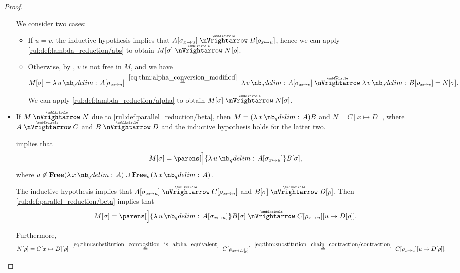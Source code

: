 \begin{proof}
\begin{itemize}
    We consider two cases:
    \begin{itemize}
      \item If \( u = v \), the inductive hypothesis implies that \( A[\sigma_{x \mapsto u}] \ppred B[\rho_{x \mapsto u}] \), hence we can apply \ref{rul:def:lambda_reduction/abs} to obtain \( M[\sigma] \ppred N[\rho] \).

      \item Otherwise, by , \( v \) is not free in \( M \), and we have
      \begin{equation*}
        M[\sigma]
        =
        \qabs u A[\sigma_{x \mapsto u}]
        \reloset {\eqref{eq:thm:alpha_conversion_modified}} \aequiv
        \qabs v A[\sigma_{x \mapsto v}]
        \reloset {\T{ind.}} \ppred
        \qabs v B[\rho_{x \mapsto v}]
        =
        N[\sigma].
      \end{equation*}

      We can apply \ref{rul:def:lambda_reduction/alpha} to obtain \( M[\sigma] \ppred N[\sigma] \).
    \end{itemize}

    \item If \( M \ppred N \) due to \ref{rul:def:parallel_reduction/beta}, then \( M = (\qabs x A)B \) and \( N = C[x \mapsto D] \), where \( A \ppred C \) and \( B \ppred D \) and the inductive hypothesis holds for the latter two.

     implies that
    \begin{equation*}
      M[\sigma] = \parens[\Big]{ \qabs u A[\sigma_{x \mapsto u}] } B[\sigma],
    \end{equation*}
    where \( u \not\in \op*{Free}(\qabs x A) \cup \op*{Free}_\sigma(\qabs x A) \).

    The inductive hypothesis implies that \( A[\sigma_{x \mapsto u}] \ppred C[\rho_{x \mapsto u}] \) and \( B[\sigma] \ppred D[\rho] \). Then \ref{rul:def:parallel_reduction/beta} implies that
    \begin{equation*}
      M[\sigma]
      =
      \parens[\Big]{ \qabs u A[\sigma_{x \mapsto u}] } B[\sigma]
      \ppred
      C[\rho_{x \mapsto u}][u \mapsto D[\rho]].
    \end{equation*}

    Furthermore,
    \begin{equation*}
      N[\rho]
      =
      C[x \mapsto D][\rho]
      \reloset {\eqref{eq:thm:substitution_composition_is_alpha_equivalent}} \aequiv
      C[\rho_{x \mapsto D[\rho]}]
      \reloset {\eqref{eq:thm:substitution_chain_contraction/contraction}} \aequiv
      C[\rho_{x \mapsto u}][u \mapsto D[\rho]].
    \end{equation*}


\end{itemize}
\end{proof}
